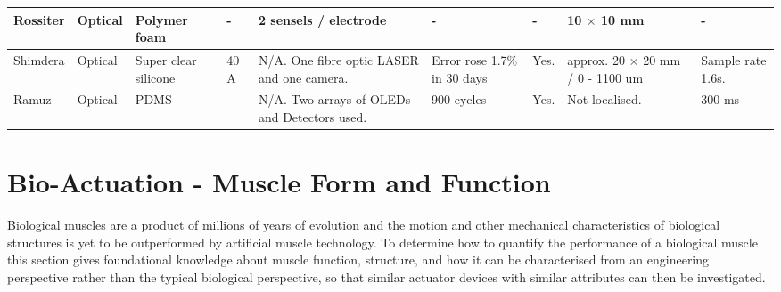 \begin{landscape}
\begin{table}[H]
\begin{tabular}{|L{2.9cm}|L{2.4cm}|L{2.8cm}|L{3cm}|L{3.0cm}|L{2cm}|L{2.4cm}|L{2cm}|L{2.1cm}|}
				Rossiter \citep{Rossiter2005} & Optical & Polymer foam & - & 2 sensels / electrode & - & - & 10 $\times$ 10 mm & - \\ \hline
				Shimdera \citep{Shimadera2022} & Optical & Super clear silicone & 40 A & N/A. One fibre optic LASER and   one camera. & Error rose 1.7\% in 30 days & Yes. & approx. 20 $\times$ 20 mm / 0 - 1100 um & Sample rate 1.6s. \\ \hline
				Ramuz \citep{Ramuz2012} & Optical & PDMS & - & N/A. Two arrays of OLEDs and Detectors used. & 900 cycles & Yes. & Not localised. & 300 ms \\ \hline
			\end{tabular}
		\end{table}
\end{landscape}

%
%


\section{Bio-Actuation - Muscle Form and Function}

Biological muscles are a product of millions of years of evolution and the motion and other mechanical characteristics of biological structures is yet to be outperformed by artificial muscle technology. To determine how to quantify the performance of a biological muscle this section gives foundational knowledge about muscle function, structure, and how it can be characterised from an engineering perspective rather than the typical biological perspective, so that similar actuator devices with similar attributes can then be investigated.

